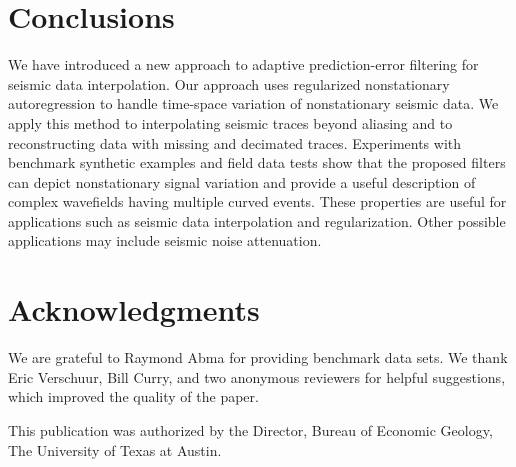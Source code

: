 \section{Conclusions}
We have introduced a new approach to adaptive prediction-error
filtering for seismic data interpolation. Our approach uses
regularized nonstationary autoregression to handle time-space
variation of nonstationary seismic data. We apply this method to
interpolating seismic traces beyond aliasing and to reconstructing
data with missing and decimated traces. Experiments with benchmark
synthetic examples and field data tests show that the proposed filters
can depict nonstationary signal variation and provide a useful
description of complex wavefields having multiple curved events. These
properties are useful for applications such as seismic data
interpolation and regularization. Other possible applications may
include seismic noise attenuation.

\section{Acknowledgments}
We are grateful to Raymond Abma for providing benchmark data sets. We
thank Eric Verschuur, Bill Curry, and two anonymous reviewers for
helpful suggestions, which improved the quality of the paper.

This publication was authorized by the Director, Bureau of Economic
Geology, The University of Texas at Austin.




